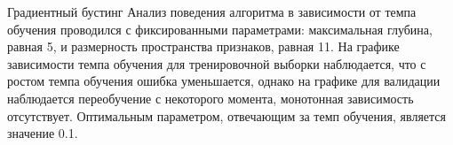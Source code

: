 \documentclass[12pt]{article}
\begin{document}
\begin{section}{Градиентный бустинг}
Анализ поведения алгоритма в зависимости от темпа обучения проводился с фиксированными параметрами: максимальная глубина, равная 5, и размерность пространства признаков, равная 11. На графике зависимости темпа обучения для тренировочной выборки наблюдается, что с ростом темпа обучения ошибка уменьшается, однако на графике для валидации наблюдается переобучение с некоторого момента, монотонная зависимость отсутствует. Оптимальным параметром, отвечающим за темп обучения, является значение 0.1. 

\begin{figure}[h!]
\begin{minipage}[h]{0.5\linewidth}
\end{minipage}
\hfill
\begin{minipage}[h]{0.5\linewidth}

\end{minipage}
\end{figure}
\end{section}
\end{document}
